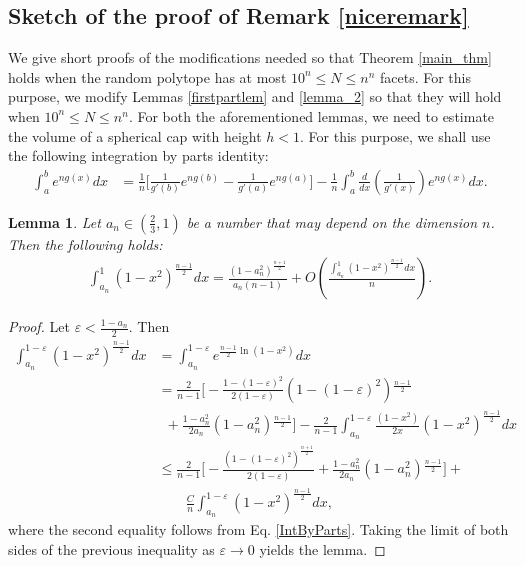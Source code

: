 \documentclass[10pt, twoside, leqno]{article}
\newtheorem{lemma}[thm]{Lemma}
\theoremstyle{definition}
\numberwithin{equation}{section}
\newcommand{\be}{\begin{equation}}
\newcommand{\ee}{\end{equation}}
\begin{document}
\subsection*{Sketch of the proof of  Remark \ref{niceremark}}
 We give short proofs of the  modifications needed so that Theorem \ref{main_thm} holds when the random polytope has at most $ 10^n \leq N \leq n^n$ facets.   
For this purpose, we modify  Lemmas \ref{firstpartlem} and \ref{lemma_2} so that they will hold when  $ 10^n \leq N \leq n^n.$ For both the aforementioned lemmas, we need to estimate the volume of a spherical cap with height $ h< 1 $. For this purpose, we shall use the following integration by parts identity:
\begin{equation}\label{IntByParts}
	\begin{aligned}
\int_{a}^{b}e^{ng(x)}dx &= \frac{1}{n}\bigg[ \frac{1}{g'(b)}e^{ng(b)} - \frac{1}{g'(a)}e^{ng(a)} \bigg]- \frac{1}{n}\int_{a}^{b}\frac{d}{dx}\left(\frac{1}{g'(x)}\right)e^{ng(x)}dx.
\end{aligned}
\end{equation}	
\begin{lemma}{\label{laplaceaprox}}
	Let $ a_n \in (\frac{2}{3},1)$ be a number that may depend on the dimension $ n $. Then the following holds:
	\be
	\begin{aligned}
	\int_{a_n}^{1}\left(1-x^{2}\right)^{\frac{n-1}{2}}dx = \frac{\left(1-a_n^{2}\right)^{\frac{n+1}{2}}}{a_n\left(n-1\right)}+O\left(\frac{\int_{a_n}^{1}\left(1-x^{2}\right)^{\frac{n-1}{2}}dx}{n}\right).
\end{aligned}
	\ee
\end{lemma}
\begin{proof}
	Let $ \varepsilon < \frac{1-a_n}{2}$. Then
\begin{align*}\int_{a_{n}}^{1-\varepsilon}\left(1-x^{2}\right)^{\frac{n-1}{2}}dx & =\int_{a_{n}}^{1-\varepsilon}e^{\frac{n-1}{2}\ln(1-x^{2})}dx\\
& =\frac{2}{n-1}\bigg[-\frac{1-(1-\varepsilon)^{2}}{2(1-\varepsilon)}(1-(1-\varepsilon)^{2}){}^{\frac{n-1}{2}}\\
& \,\,\,+\frac{1-a_{n}^{2}}{2a_{n}}(1-a_{n}^{2}){}^{\frac{n-1}{2}}\bigg]-\frac{2}{n-1}\int_{a_{n}}^{1-\varepsilon}\frac{(1-x^{2})}{2x}\left(1-x^{2}\right)^{\frac{n-1}{2}}dx\\
& \leq\frac{2}{n-1}\bigg[-\frac{(1-(1-\varepsilon)^{2})^{\frac{n+1}{2}}}{2(1-\varepsilon)}+\frac{1-a_{n}^{2}}{2a_{n}}(1-a_{n}^{2}){}^{\frac{n-1}{2}}\bigg]+\\
& \quad\quad\frac{C}{n}\int_{a_{n}}^{1-\varepsilon}\left(1-x^{2}\right)^{\frac{n-1}{2}}dx,
\end{align*}
	where the second equality follows from Eq. \eqref{IntByParts}. Taking the limit of both sides of the previous inequality as $\varepsilon\to 0$ yields the lemma. %
\end{proof}
\end{document}
